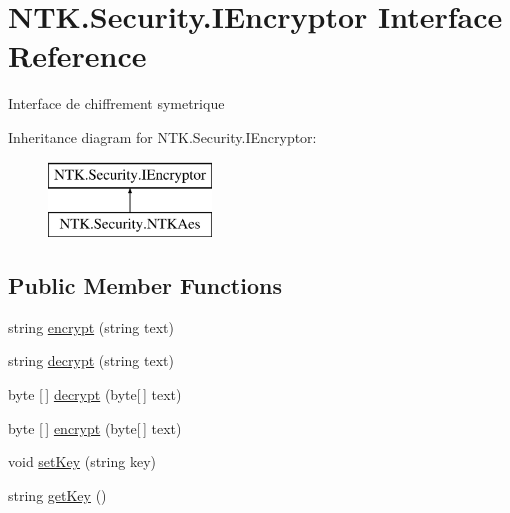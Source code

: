 \hypertarget{interface_n_t_k_1_1_security_1_1_i_encryptor}{}\section{N\+T\+K.\+Security.\+I\+Encryptor Interface Reference}
\label{interface_n_t_k_1_1_security_1_1_i_encryptor}


Interface de chiffrement symetrique  


Inheritance diagram for N\+T\+K.\+Security.\+I\+Encryptor\+:\begin{figure}[H]
\begin{center}
\leavevmode
\includegraphics[height=2.000000cm]{d0/dd6/interface_n_t_k_1_1_security_1_1_i_encryptor}
\end{center}
\end{figure}
\subsection*{Public Member Functions}
\begin{DoxyCompactItemize}
\item 
string \mbox{\hyperlink{interface_n_t_k_1_1_security_1_1_i_encryptor_a5ed0f74ca96c48c6b36c209e5847d3d1}{encrypt}} (string text)
\item 
string \mbox{\hyperlink{interface_n_t_k_1_1_security_1_1_i_encryptor_a036ade24943e0fe14d7dbc9637015a0f}{decrypt}} (string text)
\item 
byte \mbox{[}$\,$\mbox{]} \mbox{\hyperlink{interface_n_t_k_1_1_security_1_1_i_encryptor_a90100151bcdff754395c3cc801438a1a}{decrypt}} (byte\mbox{[}$\,$\mbox{]} text)
\item 
byte \mbox{[}$\,$\mbox{]} \mbox{\hyperlink{interface_n_t_k_1_1_security_1_1_i_encryptor_a6a993afc13699a6dcdedcdb092fbbea4}{encrypt}} (byte\mbox{[}$\,$\mbox{]} text)
\item 
void \mbox{\hyperlink{interface_n_t_k_1_1_security_1_1_i_encryptor_af4535102ef70526422662857b557971e}{set\+Key}} (string key)
\item 
string \mbox{\hyperlink{interface_n_t_k_1_1_security_1_1_i_encryptor_a8e93c4114dd5cb6510465381a7fe3228}{get\+Key}} ()
\end{DoxyCompactItemize}


